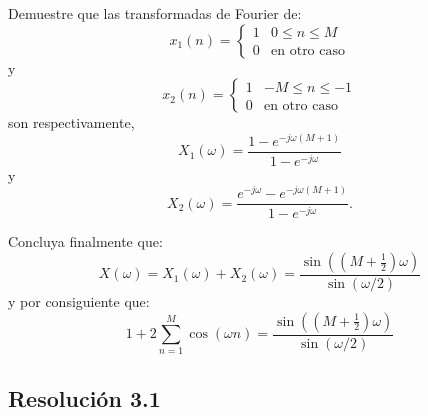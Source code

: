 \documentclass[
  11pt,
  letterpaper,
   addpoints,
   answers
  ]{exam}
\begin{document}
\begin{questions}
Demuestre que las transformadas de Fourier de:
\[
x_1(n) = \begin{cases}
1 & 0 \leq n \leq M \\
0 & \text{en otro caso}
\end{cases}
\]
y
\[
x_2(n) = \begin{cases}
1 & -M \leq n \leq -1 \\
0 & \text{en otro caso}
\end{cases}
\]
son respectivamente,
\[
X_1(\omega) = \frac{1 - e^{-j\omega(M+1)}}{1 - e^{-j\omega}}
\]
y
\[
X_2(\omega) = \frac{e^{-j\omega} - e^{-j\omega(M+1)}}{1 - e^{-j\omega}}.
\]

Concluya finalmente que:
\[
X(\omega) = X_1(\omega) + X_2(\omega) = \frac{\sin\left((M+\frac{1}{2})\omega\right)}{\sin(\omega/2)}
\]
y por consiguiente que:
\[
1 + 2\sum_{n=1}^{M} \cos(\omega n) = \frac{\sin\left((M+\frac{1}{2})\omega\right)}{\sin(\omega/2)}
\]

\begin{solution}

\subsection*{Resolución 3.1}


\end{solution}
\end{questions}
\end{document}
